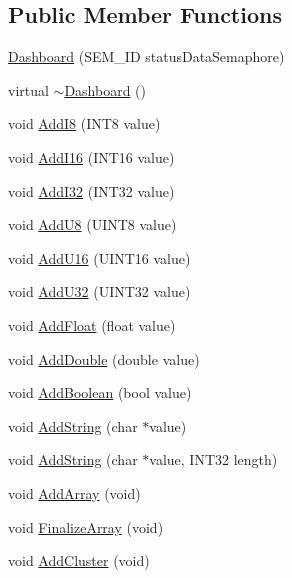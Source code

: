\subsection*{\-Public \-Member \-Functions}
\begin{DoxyCompactItemize}
\item 
\hyperlink{classDashboard_aa424d4887cf702e75073a88a7ac4d0a7}{\-Dashboard} (\-S\-E\-M\-\_\-\-I\-D status\-Data\-Semaphore)
\item 
virtual \hyperlink{classDashboard_a43a9becd0adb8641b81174de35842690}{$\sim$\-Dashboard} ()
\item 
void \hyperlink{classDashboard_ac568575b3dbece4aae029e82c5397238}{\-Add\-I8} (\-I\-N\-T8 value)
\item 
void \hyperlink{classDashboard_a3d2314c2e037b8e37351796a09aa31d1}{\-Add\-I16} (\-I\-N\-T16 value)
\item 
void \hyperlink{classDashboard_ac1e993c3851ecc7f20917efb56673959}{\-Add\-I32} (\-I\-N\-T32 value)
\item 
void \hyperlink{classDashboard_a640538e7f8d38d9fe920ebcf7be46557}{\-Add\-U8} (\-U\-I\-N\-T8 value)
\item 
void \hyperlink{classDashboard_ae9bad9b10e49d30da5fa94d74f074d1c}{\-Add\-U16} (\-U\-I\-N\-T16 value)
\item 
void \hyperlink{classDashboard_a91962630887557f93fa4515d4a28ebf0}{\-Add\-U32} (\-U\-I\-N\-T32 value)
\item 
void \hyperlink{classDashboard_a948fb34947acc01880f7d5eacec8cd2d}{\-Add\-Float} (float value)
\item 
void \hyperlink{classDashboard_a0e780e771771b87659c4055607056e11}{\-Add\-Double} (double value)
\item 
void \hyperlink{classDashboard_ad082687e911a3267badaa34b40ee022c}{\-Add\-Boolean} (bool value)
\item 
void \hyperlink{classDashboard_abee599f0ea1db73228f3f3361affa746}{\-Add\-String} (char $\ast$value)
\item 
void \hyperlink{classDashboard_a63eb885d150b0bc230659f6304a80efc}{\-Add\-String} (char $\ast$value, \-I\-N\-T32 length)
\item 
void \hyperlink{classDashboard_ae1ef7fc0f3f5b5ae4af4401f224e98fc}{\-Add\-Array} (void)
\item 
void \hyperlink{classDashboard_acc5aa17a45d364faef2f11c899089561}{\-Finalize\-Array} (void)
\item 
void \hyperlink{classDashboard_a15ea9ceb6a28076ced563ce4a7337e83}{\-Add\-Cluster} (void)

\end{DoxyCompactItemize}
